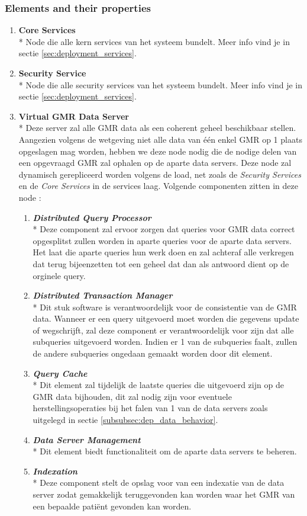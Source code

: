 \documentclass[a4paper,10pt]{article}
\begin{document}
\subsubsection*{Elements and their properties}
\begin{enumerate}
 \item \textbf{Core Services}\\*
Node die alle kern services van het systeem bundelt. Meer info vind je in sectie \ref{sec:deployment_services}.
\item \textbf{Security Service}\\*
Node die alle security services van het systeem bundelt. Meer info vind je in sectie \ref{sec:deployment_services}.
\item \textbf{Virtual GMR Data Server}\\*
Deze server zal alle GMR data als een coherent geheel beschikbaar stellen. Aangezien volgens de wetgeving niet alle data van één enkel GMR op 1 plaats opgeslagen mag worden, hebben we deze node nodig die de nodige delen van een opgevraagd GMR zal ophalen op de aparte data servers. Deze node zal dynamisch gerepliceerd worden volgens de load, net zoals de \textit{Security Services} en de \textit{Core Services} in de services laag. Volgende componenten zitten in deze node : 
\begin{enumerate}
 \item \textit{\textbf{Distributed Query Processor}}\\*
Deze component zal ervoor zorgen dat queries voor GMR data correct opgesplitst zullen worden in aparte queries voor de aparte data servers. Het laat die aparte queries hun werk doen en zal achteraf alle verkregen dat terug bijeenzetten tot een geheel dat dan als antwoord dient op de orginele query.
\item \textit{\textbf{Distributed Transaction Manager}}\\*
Dit stuk software is verantwoordelijk voor de consistentie van de GMR data. Wanneer er een query uitgevoerd moet worden die gegevens update of wegschrijft, zal deze component er verantwoordelijk voor zijn dat alle subqueries uitgevoerd worden. Indien er 1 van de subqueries faalt, zullen de andere subqueries ongedaan gemaakt worden door dit element.
\item \textit{\textbf{Query Cache}}\\*
Dit element zal tijdelijk de laatste queries die uitgevoerd zijn op de GMR data bijhouden, dit zal nodig zijn voor eventuele herstellingsoperaties bij het falen van 1 van de data servers zoals uitgelegd in sectie \ref{subsubsec:dep_data_behavior}.
\item \textit{\textbf{Data Server Management}}\\*
Dit element biedt functionaliteit om de aparte data servers te beheren.
\item \textit{\textbf{Indexation}}\\*
Deze component stelt de opslag voor van een indexatie van de data server zodat gemakkelijk teruggevonden kan worden waar het GMR van een bepaalde patiënt gevonden kan worden.
\end{enumerate}


\end{enumerate}
\end{document}
